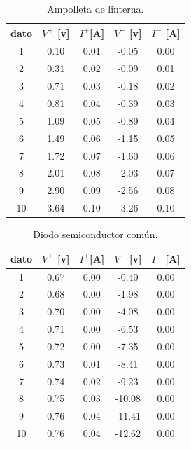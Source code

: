 \documentclass[]{article}
\begin{document}
\begin{table}
  \centering
  \begin{tabular}{|c|c|c|c|c|} \hline
    dato    &   $V^{+}$ [v]  &    $I^{+}$[A]  &   $V^{-}$ [v]  &    $I^{-}$ [A]  \\ \hline
    1& 0.10 &0.01 &-0.05& 0.00 \\ \hline
    2&0.31 &0.02  &-0.09& 0.01 \\ \hline
    3&0.71 &0.03 &-0.18& 0.02 \\ \hline
    4&0.81 &0.04 &-0.39& 0.03 \\ \hline
    5&1.09 &0.05 &-0.89& 0.04 \\ \hline
    6& 1.49 &0.06 &-1.15& 0.05 \\ \hline
    7& 1.72 &0.07 &-1.60& 0.06 \\ \hline
    8& 2.01 &0.08 &-2.03& 0.07 \\ \hline
    9& 2.90 &0.09  &-2.56& 0.08 \\ \hline
    10& 3.64 &0.10 &-3.26& 0.10 \\ \hline
    
    
  \end{tabular}
  \caption{\label{tab: ampolleta} Ampolleta de linterna. }
\end{table}



\begin{table}
  \centering
  \begin{tabular}{|c|c|c|c|c|} \hline
    dato    &   $V^{+}$ [v]  &    $I^{+}$[A]  &   $V^{-}$ [v]  &    $I^{-}$ [A]  \\ \hline
    1&0.67& 0.00&     -0.40& 0.00\\ \hline
    2&0.68& 0.00&     -1.98& 0.00\\ \hline
    3&0.70& 0.00&     -4.08& 0.00\\ \hline
    4&0.71& 0.00&     -6.53& 0.00\\ \hline
    5&0.72& 0.00&     -7.35& 0.00\\ \hline
    6&0.73& 0.01&     -8.41& 0.00\\ \hline
    7&0.74& 0.02&     -9.23& 0.00\\ \hline
    8&0.75& 0.03&     -10.08& 0.00\\ \hline
    9&0.76& 0.04&     -11.41& 0.00\\ \hline
    10&0.76& 0.04&     -12.62& 0.00 \\ \hline
    
    
  \end{tabular}
  \caption{\label{tab: diodo-comun} Diodo semiconductor común.}
\end{table}
\end{document}
